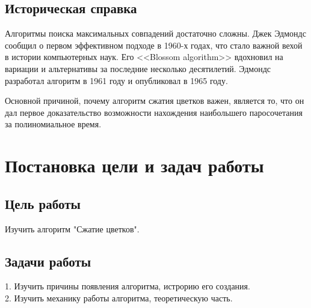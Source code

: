 \documentclass[14pt, a4paper]{extarticle}
\begin{document}
   
    \subsection*{Историческая справка}

    Алгоритмы поиска максимальных совпадений достаточно сложны. Джек Эдмондс сообщил о первом эффективном подходе в 1960-х годах, что стало важной вехой в истории компьютерных наук. Его <<Blossom algorithm>> вдохновил на вариации и альтернативы за последние несколько десятилетий.
    Эдмондс разработал алгоритм в 1961 году и опубликовал в 1965 году. 
    
    Основной причиной, почему алгоритм сжатия цветков важен, является то, что он дал первое доказательство возможности нахождения наибольшего паросочетания за полиномиальное время. 

    \pagebreak

    \section*{Постановка цели и задач работы}

    \subsection*{Цель работы}

    Изучить алгоритм "Сжатие цветков".

    \subsection*{Задачи работы}

    1. Изучить причины появления алгоритма, истрорию его создания.\\

    2. Изучить механику работы алгоритма, теоретическую часть.\\
\end{document}
